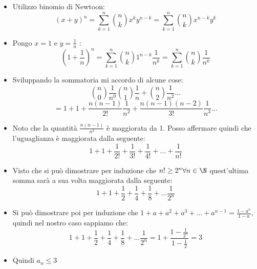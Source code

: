 \begin{itemize}
	\item  Utilizzo binomio di Newtoon:
	\[
	\left( x+y \right)^{n} = \sum_{k=1}^{n} \binom{n}{k}x^{k}y^{n-k} = \sum_{k=1}^{n} \binom{n}{k} x^{n-k}y^{k} 
	\] 
	\item Pongo $x=1$ e $y= \frac{1}{n}$ :
	\[
	\left( 1+\frac{1}{n} \right) ^{n}= \sum_{k=1}^{n} \binom{n}{k}1^{n-k}\frac{1}{n^{k}} = \sum_{k=1}^{n} \binom{n}{k} \frac{1}{n^{k}}
\] 
	\item Sviluppando la sommatoria mi accordo di alcune cose:
	\[
	 \binom{n}{0}\frac{1}{n^{0}}  \binom{n}{1} \frac{1}{n} + \binom{n}{2}\frac{1}{n^2}\ldots
	\] 
	\[
	= 1 + 1 + \frac{n \left( n-1 \right) }{2!} \frac{1}{n^2} + \frac{n \left( n-1 \right) \left( n-2 \right) }{3!} \frac{1}{n^3} \ldots
	\] 
	\item Noto che la quantità $ \frac{n\left( n-1 \right) }{n^2}$ è maggiorata da 1. Posso affermare quindi che l'uguaglianza è maggiorata dalla seguente:
	\[
	1+1+\frac{1}{2!}+ \frac{1}{3!}+ \frac{1}{4!}+\ldots+ \frac{1}{n!}
	\] 
	\item Visto che si può dimostrare per induzione che $ n! \ge 2^{n} \forall n \in  \N$ quest'ultima somma sarà a sua volta maggiorata dalla seguente:
	\[
	1+1+\frac{1}{2} + \frac{1}{4} + \frac{1}{8} + \ldots \frac{1}{2^n}
	\] 
	\item Si può dimostrare poi per induzione che $1 + a + a^2 + a^3 + \ldots + a^{n-1} = \frac{1-a^{n}}{1-a}$, quindi nel nostro caso sappiamo che:
	\[
	1+1+\frac{1}{2} + \frac{1}{4} + \frac{1}{8} + \ldots \frac{1}{2^n} = 1+\frac{1-\frac{1}{2^{n}}}{1-\frac{1}{2}} = 3
	\] 
	\item Quindi $a_n \le 3$
\end{itemize}
